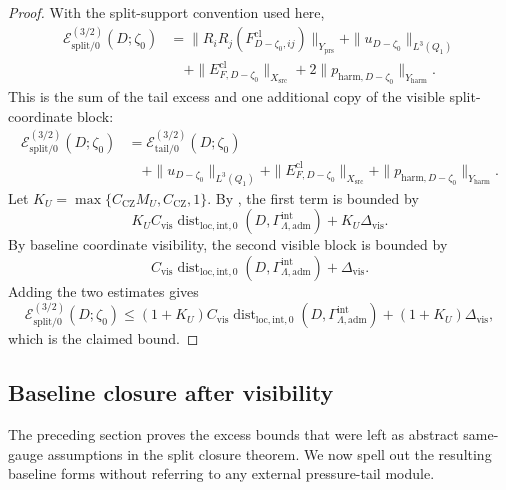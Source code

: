 \documentclass[11pt]{article}
\numberwithin{equation}{section}
\theoremstyle{definition}
\theoremstyle{remark}
\newcommand{\loc}{\mathrm{loc}}
\newcommand{\intg}{\mathrm{int}}
\newcommand{\tail}{\mathrm{tail}}
\newcommand{\spl}{\mathrm{split}}
\newcommand{\adm}{\mathrm{adm}}
\newcommand{\prs}{\mathrm{prs}}
\newcommand{\harm}{\mathrm{harm}}
\newcommand{\src}{\mathrm{src}}
\newcommand{\cl}{\mathrm{cl}}
\newcommand{\CZ}{\mathrm{CZ}}
\newcommand{\Dist}{\operatorname{dist}}
\newcommand{\calE}{\mathcal E}
\newcommand{\Gammaadm}{\Gamma^{\intg}_{\Lambda,\adm}}
\begin{document}
\begin{proof}
With the split-support convention used here,
\[
\begin{aligned}
    \calE_{\spl/0}^{(3/2)}(D;\zeta_0)
    &=
    \|R_iR_j(F^{\cl}_{D-\zeta_0,ij})\|_{Y_{\prs}}
    +
    \|u_{D-\zeta_0}\|_{L^3(Q_1)}
\\
    &\quad
    +
    \|E^{\cl}_{F,D-\zeta_0}\|_{X_{\src}}
    +
    2\|p_{\harm,D-\zeta_0}\|_{Y_{\harm}}.
\end{aligned}
\]
This is the sum of the tail excess and one additional copy of the visible
split-coordinate block:
\[
\begin{aligned}
    \calE_{\spl/0}^{(3/2)}(D;\zeta_0)
    &=
    \calE_{\tail/0}^{(3/2)}(D;\zeta_0)
\\
    &\quad+
    \|u_{D-\zeta_0}\|_{L^3(Q_1)}
    +
    \|E^{\cl}_{F,D-\zeta_0}\|_{X_{\src}}
    +
    \|p_{\harm,D-\zeta_0}\|_{Y_{\harm}}.
\end{aligned}
\]
Let \(K_U=\max\{C_{\CZ}M_U,C_{\CZ},1\}\).  By
, the first term is bounded by
\[
    K_U C_{\mathrm{vis}}
    \Dist_{\loc,\intg,0}(D,\Gammaadm)
    +
    K_U\Delta_{\mathrm{vis}}.
\]
By baseline coordinate visibility, the second visible block is bounded by
\[
    C_{\mathrm{vis}}
    \Dist_{\loc,\intg,0}(D,\Gammaadm)
    +
    \Delta_{\mathrm{vis}}.
\]
Adding the two estimates gives
\[
    \calE_{\spl/0}^{(3/2)}(D;\zeta_0)
    \le
    (1+K_U)C_{\mathrm{vis}}
    \Dist_{\loc,\intg,0}(D,\Gammaadm)
    +
    (1+K_U)\Delta_{\mathrm{vis}},
\]
which is the claimed bound.
\end{proof}


\subsection{Baseline closure after visibility}
\label{sec:visibility-driven-closure}

The preceding section proves the excess bounds that were left as abstract
same-gauge assumptions in the split closure theorem.  We now spell out the
resulting baseline forms without referring to any external pressure-tail
module.
\end{document}
